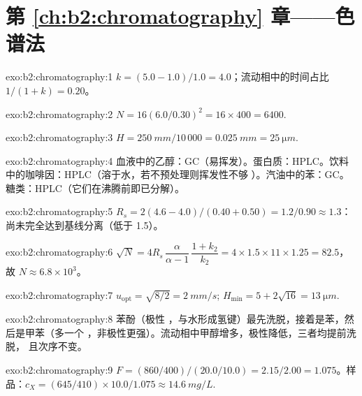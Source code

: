 \section*{第 \ref{ch:b2:chromatography} 章——色谱法}

\begin{solution}{exo:b2:chromatography:1}
$k = (5.0 - 1.0)/1.0 = 4.0$；流动相中的时间占比 $1/(1 + k) = 0.20$。
\end{solution}

\begin{solution}{exo:b2:chromatography:2}
$N = 16(6.0/0.30)^2 = 16 \times 400 = 6400$.
\end{solution}

\begin{solution}{exo:b2:chromatography:3}
$H = \qty{250}{mm}/10\,000 = \qty{0.025}{mm} = \qty{25}{\micro m}$.
\end{solution}

\begin{solution}{exo:b2:chromatography:4}
血液中的乙醇：GC（易挥发）。蛋白质：HPLC。饮料中的咖啡因：HPLC（溶于水，若不预处理则挥发性不够
）。汽油中的苯：GC。糖类：HPLC（它们在沸腾前即已分解）。
\end{solution}

\begin{solution}{exo:b2:chromatography:5}
$R_s = 2(4.6 - 4.0)/(0.40 + 0.50) = 1.2/0.90 \approx 1.3$：尚未完全达到基线分离（低于 1.5）。
\end{solution}

\begin{solution}{exo:b2:chromatography:6}
$\sqrt N = 4R_s\,\dfrac{\alpha}{\alpha - 1}\,\dfrac{1 + k_2}{k_2} = 4 \times 1.5 \times 11 \times 1.25 =
82.5$，故 $N \approx 6.8 \times 10^3$。
\end{solution}

\begin{solution}{exo:b2:chromatography:7}
$u_{\mathrm{opt}} = \sqrt{8/2} = \qty{2}{mm/s}$; $H_{\min} = 5 + 2\sqrt{16} = \qty{13}{\micro m}$.
\end{solution}

\begin{solution}{exo:b2:chromatography:8}
苯酚（极性 ，与水形成氢键）最先洗脱，接着是苯，然后是甲苯（多一个
，非极性更强）。流动相中甲醇增多，极性降低，三者均提前洗脱，
且次序不变。
\end{solution}

\begin{solution}{exo:b2:chromatography:9}
$F = (860/400)/(20.0/10.0) = 2.15/2.00 = 1.075$。样品：$c_X = (645/410) \times 10.0/1.075 \approx
\qty{14.6}{mg/L}$.
\end{solution}

